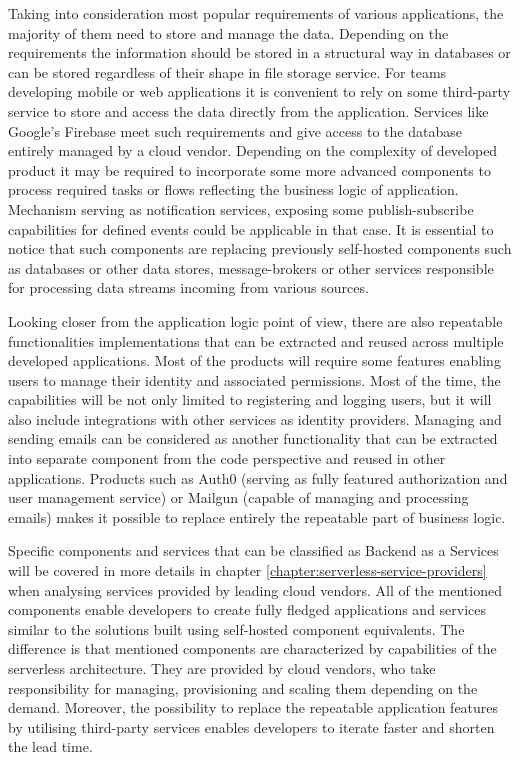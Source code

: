 Taking into consideration most popular requirements of various applications, the majority of them need to store and manage the data. Depending on the requirements the information should be stored in a structural way in databases or can be stored regardless of their shape in file storage service. For teams developing mobile or web applications it is convenient to rely on some third-party service to store and access the data directly from the application. Services like Google's Firebase meet such requirements and give access to the database entirely managed by a cloud vendor. Depending on the complexity of developed product it may be required to incorporate some more advanced components to process required tasks or flows reflecting the business logic of application. Mechanism serving as notification services, exposing some publish-subscribe capabilities for defined events could be applicable in that case. It is essential to notice that such components are replacing previously self-hosted components such as databases or other data stores, message-brokers or other services responsible for processing data streams incoming from various sources.

Looking closer from the application logic point of view, there are also repeatable functionalities implementations that can be extracted and reused across multiple developed applications. Most of the products will require some features enabling users to manage their identity and associated permissions. Most of the time, the capabilities will be not only limited to registering and logging users, but it will also include integrations with other services as identity providers. Managing and sending emails can be considered as another functionality that can be extracted into separate component from the code perspective and reused in other applications. Products such as Auth0 (serving as fully featured authorization and user management service) or Mailgun (capable of managing and processing emails) makes it possible to replace entirely the repeatable part of business logic.

Specific components and services that can be classified as Backend as a Services will be covered in more details in chapter \ref{chapter:serverless-service-providers} when analysing services provided by leading cloud vendors. All of the mentioned components enable developers to create fully fledged applications and services similar to the solutions built using self-hosted component equivalents. The difference is that mentioned components are characterized by capabilities of the serverless architecture. They are provided by cloud vendors, who take responsibility for managing, provisioning and scaling them depending on the demand. Moreover, the possibility to replace the repeatable application features by utilising third-party services enables developers to iterate faster and shorten the lead time.

